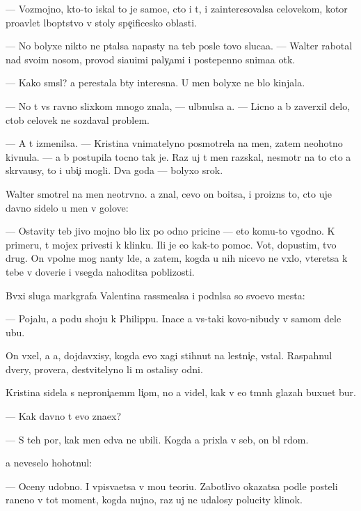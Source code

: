 \documentclass[10pt]{book}
\begin{document}
— Voz\-moj\-no, kto-to iskal to je samo{\y}e, cto i t{\yi}, i zainteresovalsa celovekom, kotor{\yi}{\y} pro{\y}avl{\ia}{\y}et l{\io}bop{\yi}tstvo v stoly spe{\c}ificesko{\y} oblasti.

— No bolyxe nikto ne p{\yi}talsa napasty na teb{\ia} posle tovo sluca{\y}a. — Walter ra\-bo\-tal nad svo{\y}im nosom, provod{\ia} si{\y}a{\y}u{\x}imi paly{\c}ami i postepenno snima{\y}a ot{\e}k.

— Kako{\y} sm{\yi}sl? {\Y}a perestala b{\yi}ty interesna. U men{\ia} bolyxe ne b{\yi}lo kinjala.

— No t{\yi} vs{\e} ravno slixkom mnogo znala, — ul{\yi}bnulsa {\y}a. — Licno {\y}a b{\yi} zaverxil delo, ctob{\yi} celovek ne sozdaval problem{\yi}.

— A t{\yi} izmenilsa. — Kristina vnimatelyno posmotrela na men{\ia}, zatem neohotno kivnula. — {\Y}a b{\yi} postupila tocno tak je. Raz uj t{\yi} men{\ia} raz{\yi}skal, ne\-smo\-tr{\ia} na to cto {\y}a skr{\yi}va{\y}usy, to i ubi{\y}{\c}i mogli. Dva goda — bolyxo{\y} srok.

Walter smotrel na men{\ia} neotr{\yi}vno. {\Y}a znal, cevo on bo{\y}itsa, i proizn{\e}s to, cto uje davno sidelo u men{\ia} v golove:

— Ostavity teb{\ia} jivo{\y} mojno b{\yi}lo lix po odno{\y} pricine — eto komu-to v{\yi}godno. K primeru, t{\yi} mojex privesti k klinku. Ili je {\y}e{\x}o kak-to pomoc. Vot, dopustim, tvo{\y} drug. On vpolne mog nan{\ia}ty l{\io}de{\y}, a zatem, kogda u nih nicevo ne v{\yi}xlo, vteretsa k tebe v doveri{\y}e i vsegda nahoditsa poblizosti.

B{\yi}vxi{\y} sluga markgrafa Valentina rassme{\y}alsa i podn{\ia}lsa so svo{\y}evo mesta:

— Pojalu{\y}, {\y}a po{\y}du shoju k Philippu. Inace {\y}a vs{\e}-taki kovo-nibudy v samom dele ub{\y}u.

On v{\yi}xel, a {\y}a, dojdavxisy, kogda {\y}evo xagi stihnut na lestni{\c}e, vstal. Raspahnul dvery, prover{\ia}{\y}a, de{\y}stvitelyno li m{\yi} ostalisy odni.

Kristina sidela s neproni{\c}a{\y}em{\yi}m li{\c}om, no {\y}a videl, kak v {\y}e{\y}o t{\e}mn{\yi}h glazah buxu{\y}et bur{\ia}.

— Kak davno t{\yi} {\y}evo zna\-{\y}ex?

— S teh por, kak men{\ia} {\y}edva ne ubili. Kogda {\y}a prixla v seb{\ia}, on b{\yi}l r{\ia}dom.

{\Y}a neveselo hohotnul:

— Oceny udobno. I vpis{\yi}va{\y}etsa v mo{\y}u teori{\y}u. Zabotlivo okazatsa podle posteli raneno{\y} v tot moment, kogda nujno, raz uj ne udalosy polucity klinok.
\end{document}
